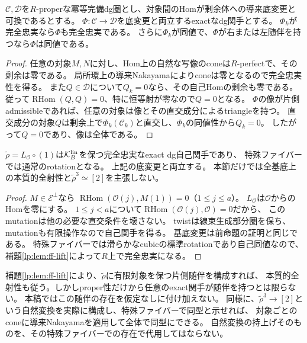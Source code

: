 \begin{lemma}[局所proper圏の完全忠実性の持上げ]\label{lp:lem:ff-lift}
$\mathcal C,\mathcal D$を$R$-properな冪等完備dg圏とし、対象間のHomが剰余体への導来底変更と可換であるとする。
$\Phi:\mathcal C\to\mathcal D$を底変更と両立するexactなdg関手とする。
$\Phi_k$が完全忠実なら$\Phi$も完全忠実である。
さらに$\Phi_k$が同値で、$\Phi$が右または左随伴を持つなら$\Phi$は同値である。
\end{lemma}
\begin{proof}
任意の対象$M,N$に対し、Hom上の自然な写像のconeは$R$-perfectで、その剰余は零である。
局所環上の導来Nakayamaによりconeは零となるので完全忠実性を得る。
また$Q\in\mathcal D$について$Q_k=0$なら、その自己Homの剰余も零である。
従って$\operatorname{RHom}(Q,Q)=0$、特に恒等射が零なので$Q=0$となる。
$\Phi$の像が片側admissibleであれば、任意の対象は像とその直交成分によるtriangleを持つ。
直交成分の対象$Q$は剰余上で$\Phi_k(\mathcal C_k)$と直交し、$\Phi_k$の同値性から$Q_k=0$。
したがって$Q=0$であり、像は全体である。
\end{proof}

\begin{proposition}[標準rotation候補の完全忠実性]\label{lp:prop:rotation-candidate}
$\widetilde\rho=L_{\mathcal O}\circ(1)$は$\mathcal K_B^{\rm lin}$を保つ完全忠実なexact dg自己関手であり、
特殊ファイバーでは通常のrotationとなる。
上記の底変更と両立する。
本節だけでは全基底上の本質的全射性と$\widetilde\rho^3\simeq[2]$を主張しない。
\end{proposition}
\begin{proof}
$M\in\mathcal E^\perp$なら
$\operatorname{RHom}(\mathcal O(j),M(1))=0$（$1\le j\le a$）。
$L_{\mathcal O}$は$\mathcal O$からのHomを零にする。
$1\le j<a$について$\operatorname{RHom}(\mathcal O(j),\mathcal O)=0$だから、
このmutationは他の必要な直交条件を壊さない。
twistは線束生成部分圏を保ち、mutationも有限操作なので自己関手を得る。
基底変更は前命題の証明と同じである。
特殊ファイバーでは滑らかなcubicの標準rotationであり自己同値なので、
補題\ref{lp:lem:ff-lift}によって$R$上で完全忠実になる。
\end{proof}
\begin{remark}[自己同値化を残す理由]
補題\ref{lp:lem:ff-lift}により、$\widetilde\rho$に有限対象を保つ片側随伴を構成すれば、
本質的全射性も従う。しかしproper性だけから任意のexact関手が随伴を持つとは限らない。
本稿ではこの随伴の存在を仮定なしに付け加えない。
同様に、$\widetilde\rho^3\to[2]$という自然変換を実際に構成し、特殊ファイバーで同型と示せれば、
対象ごとのconeに導来Nakayamaを適用して全体で同型にできる。
自然変換の持上げそのものを、その特殊ファイバーでの存在で代用してはならない。
\end{remark}

